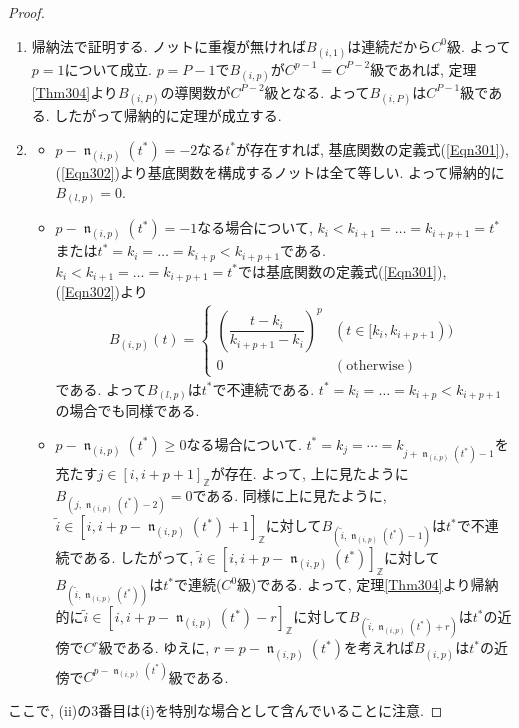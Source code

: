 \documentclass{jsarticle}
\newcommand\setZ{\mathbb{Z}}
\newcommand\Pare[1]{\left(#1\right)}
\DeclareMathOperator{\N}{\mathfrak{n}}
\theoremstyle{definition}%
\begin{document}
\begin{proof}
    \begin{enumerate}
        \renewcommand{\labelenumi}{(\roman{enumi})}
        \item 帰納法で証明する.
    	ノットに重複が無ければ$B_{(i,1)}$は連続だから$C^0$級.
    	よって$p=1$について成立.
    	$p=P-1$で$B_{(i,p)}$が$C^{p-1}=C^{P-2}$級であれば, 定理\ref{Thm304}より$B_{(i,P)}$の導関数が$C^{P-2}$級となる.
    	よって$B_{(i,P)}$は$C^{P-1}$級である.
    	したがって帰納的に定理が成立する.
        \item
        \begin{itemize}
            \item $p-\N_{(i,p)}(t^*)=-2$なる$t^*$が存在すれば, 基底関数の定義式(\ref{Eqn301}), (\ref{Eqn302})より基底関数を構成するノットは全て等しい.
            よって帰納的に$B_{(l,p)}= 0$.

            \item $p-\N_{(i,p)}(t^*)=-1$なる場合について, $k_{i}<k_{i+1}=\dots=k_{i+p+1}=t^*$または$t^*=k_{i}=\dots=k_{i+p}<k_{i+p+1}$である.
            $k_{i}<k_{i+1}=\dots=k_{i+p+1}=t^*$では基底関数の定義式(\ref{Eqn301}), (\ref{Eqn302})より
            \begin{align}
                B_{(i,p)}(t)=
                \begin{cases}
                    \Pare{\dfrac{t-k_{i}}{k_{i+p+1}-k_{i}}}^p &(t\in[k_{i}, k_{i+p+1}))\\
                    0 &(\text{otherwise})
                \end{cases}
            \end{align}
            である.
            よって$B_{(l,p)}$は$t^*$で不連続である.
            $t^*=k_{i}=\dots=k_{i+p}<k_{i+p+1}$の場合でも同様である.

            \item $p-\N_{(i,p)}(t^*)\ge 0$なる場合について.
            $t^*=k_j=\cdots=k_{j+\N_{(i,p)}(t^*)-1}$を充たす$j\in[i,i+p+1]_\setZ$が存在.
            よって, 上に見たように$B_{(j,\N_{(i,p)}(t^*)-2)}=0$である.
            同様に上に見たように, $\tilde{i}\in [i, i+p-\N_{(i,p)}(t^*)+1]_\setZ$に対して$B_{(\tilde{i},\N_{(i,p)}(t^*)-1)}$は$t^*$で不連続である.
            したがって, $\tilde{i}\in [i, i+p-\N_{(i,p)}(t^*)]_\setZ$に対して$B_{(\tilde{i},\N_{(i,p)}(t^*))}$は$t^*$で連続($C^0$級)である.
            よって, 定理\ref{Thm304}より帰納的に$\tilde{i}\in [i, i+p-\N_{(i,p)}(t^*)-r]_\setZ$に対して$B_{(\tilde{i},\N_{(i,p)}(t^*)+r)}$は$t^*$の近傍で$C^r$級である.
            ゆえに, $r=p-\N_{(i,p)}(t^*)$を考えれば$B_{(i,p)}$は$t^*$の近傍で$C^{p-\N_{(i,p)}(t^*)}$級である.\footnotemark
        \end{itemize}
    \end{enumerate}
    ここで, (ii)の3番目は(i)を特別な場合として含んでいることに注意.
\end{proof}
\end{document}
